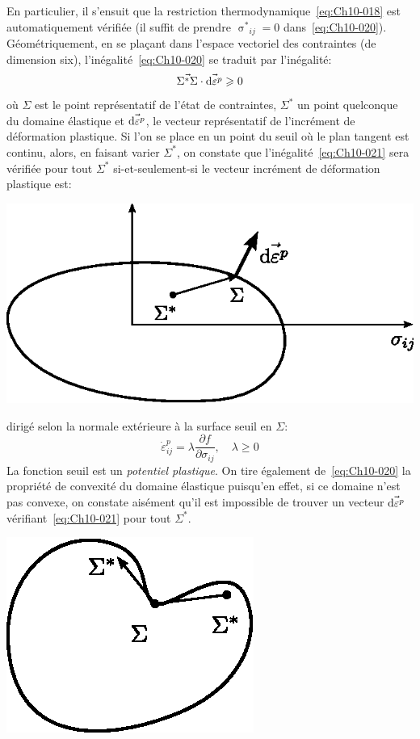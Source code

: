 En particulier, il s'ensuit que la restriction thermodynamique~\eqref{eq:Ch10-018} est automatiquement vérifiée (il suffit de prendre $\displaystyle {\mathop{\sigma}^{\ast}}_{ij}=0$ dans~\eqref{eq:Ch10-020}). 
Géométriquement, en se plaçant dans l'espace vectoriel des contraintes (de dimension six), l'inégalité~\eqref{eq:Ch10-020} se traduit par l'inégalité: 
\begin{equation}
    \vec{\Sigma^{\ast} \Sigma} \cdot \vec{\mathop{\mathrm{{}d}}\mathopen{} \varepsilon^p} \geqslant 0
    \label{eq:Ch10-021}
\end{equation}
où $\Sigma$ est le point représentatif de l'état de contraintes, $\Sigma^{\ast}$ un point quelconque du domaine élastique et $\vec{\mathop{\mathrm{{}d}}\mathopen{} \varepsilon^p}$, le vecteur représentatif de l'incrément de déformation plastique. 
Si l'on se place en un point du seuil où le plan tangent est continu, alors, en faisant varier $\Sigma^{\ast}$, on constate que l'inégalité~\eqref{eq:Ch10-021} sera vérifiée pour tout $\Sigma^{\ast}$ si-et-seulement-si le vecteur incrément de déformation plastique est: 
\begin{center}
    \includegraphics{../images/T1_Ch10-09}
\end{center}
dirigé selon la normale extérieure à la surface seuil en $\Sigma$: 
\begin{equation}
    \dot{\varepsilon}_{ij}^p = \lambda \frac{\partial f}{\partial \sigma_{ij}},\quad \lambda \geq 0
    \label{eq:Ch10-022}
\end{equation}
La fonction seuil est un \emph{potentiel plastique}.
On tire également de~\eqref{eq:Ch10-020} la propriété de convexité du domaine élastique puisqu'en effet, si ce domaine n'est pas convexe, on constate aisément qu'il est impossible de trouver un vecteur $\vec{\mathop{\mathrm{{}d}}\mathopen{} \varepsilon^p}$ vérifiant~\eqref{eq:Ch10-021} pour tout $\Sigma^{\ast}$.

    \begin{center}
        \includegraphics{../images/T1_Ch10-10}
    \end{center}


